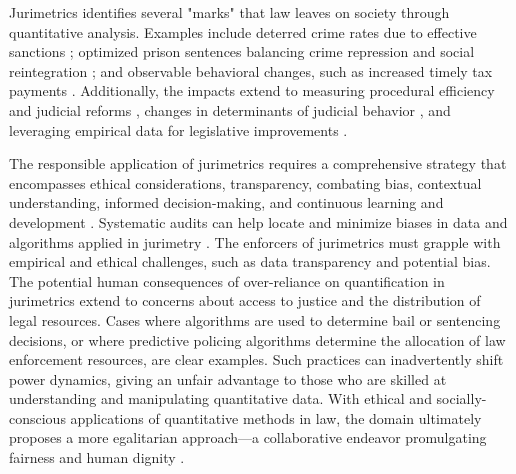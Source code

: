 Jurimetrics identifies several "marks" that law leaves on society through quantitative analysis. Examples include deterred crime rates due to effective sanctions \cite{nunes2016}; optimized prison sentences balancing crime repression and social reintegration \cite{nunes2016}; and observable behavioral changes, such as increased timely tax payments \cite{nunes2016}. Additionally, the impacts extend to measuring procedural efficiency and judicial reforms \cite{nunes2016}, changes in determinants of judicial behavior \cite{nunes2016}, and leveraging empirical data for legislative improvements \cite{nunes2016}.

The responsible application of jurimetrics requires a comprehensive strategy that encompasses ethical considerations, transparency, combating bias, contextual understanding, informed decision-making, and continuous learning and development \cite{10.1590/data.2022.65.3.267,loevinger1959}. Systematic audits can help locate and minimize biases in data and algorithms applied in jurimetry \cite{10.1590/data.2022.65.3.267,loevinger1959}. The enforcers of jurimetrics must grapple with empirical and ethical challenges, such as data transparency and potential bias. The potential human consequences of over-reliance on quantification in jurimetrics extend to concerns about access to justice and the distribution of legal resources. Cases where algorithms are used to determine bail or sentencing decisions, or where predictive policing algorithms determine the allocation of law enforcement resources, are clear examples. Such practices can inadvertently shift power dynamics, giving an unfair advantage to those who are skilled at understanding and manipulating quantitative data. With ethical and socially-conscious applications of quantitative methods in law, the domain ultimately proposes a more egalitarian approach—a collaborative endeavor promulgating fairness and human dignity \cite{10.1007/s11186-021-09453-1,international2015,10.3390/fi9040068,10.1080/07329113.2015.1046739,10.1590/15174522-105471,10.1590/data.2022.65.3.267,loevinger1959,10.2307/2654208,demortain2019politics,10.5040/9781350220645,10.1057/s41599-020-0396-5,10.1057/s41599-020-00557-0,comptabilitat0018,salais2016quantification,10.1017/s0003975609000150,10.1017/s0003975609000150,supiot2018,nunes2016jurimetrics,10.1007/s11186-021-09453-1,de2010jurimetrics,zabala2019decades}.

